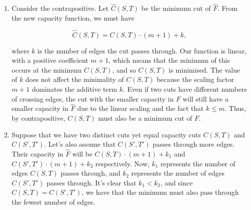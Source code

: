 \documentclass{article}
\begin{document}
\begin{solution}
\begin{enumerate}[label = (\alph*)]
    \item Consider the contrapositive. Let $\hat{C}(S,T)$ be the minimum cut of $\hat{F}$. From the new capacity function, we must have

$$\hat{C}(S,T) = C(S,T) \cdot (m + 1) + k,$$

where $k$ is the number of edges the cut passes through. Our function is linear, with a positive coefficient $m+1$, which means that the minimum of this occurs at the minimum $C(S,T)$, and so $C(S,T)$ is minimised. The value of $k$ does not affect the minimality of $C(S,T)$ because the scaling factor $m+1$ dominates the additive term $k$. Even if two cuts have different numbers of crossing edges, the cut with the smaller capacity in $F$ will still have a smaller capacity in $\hat{F}$ due to the linear scaling and the fact that $k \leq m$. Thus, by contrapositive, $C(S,T)$ must also be a minimum cut of $F$.

\item Suppose that we have two distinct cuts yet equal capacity cuts $C(S, T)$ and $C(S', T')$. Let's also assume that $C(S',T')$ passes through more edges. Their capacity in $\hat{F}$ will be $C(S,T)\cdot (m+1) + k_1$ and $C(S',T')\cdot (m+1) + k_2$ respectively. Now, $k_1$ represents the number of edges $C(S,T)$ passes through, and $k_2$ represents the number of edges $C(S', T')$ passes through. It's clear that $k_1 < k_2$, and since $C(S,T) = C(S', T')$, we have that the minimum must also pass through the fewest number of edges. 
\end{enumerate}
\end{solution}
\end{document}
